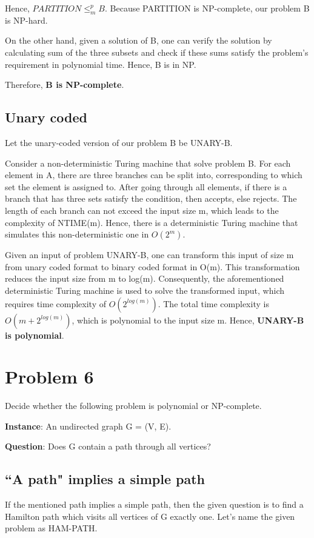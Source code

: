 \documentclass{article}
\begin{document}
Hence, $PARTITION \le_{m}^{p} B$. Because PARTITION is NP-complete, our problem B is NP-hard.

On the other hand, given a solution of B, one can verify the solution by calculating sum of the three subsets and check if these sums satisfy the problem's requirement in polynomial time. Hence, B is in NP.

Therefore,\textbf{ B is NP-complete}.

\subsection{Unary coded}

Let the unary-coded version of our problem B be UNARY-B.

Consider a non-deterministic Turing machine that solve problem B. For each element in A, there are three branches can be split into, corresponding to which set the element is assigned to. After going through all elements, if there is a branch that has three sets satisfy the condition, then accepts, else rejects. The length of each branch can not exceed the input size m, which leads to the complexity of NTIME(m). Hence, there is a deterministic Turing machine that simulates this non-deterministic one in $O(2^m)$.

Given an input of problem UNARY-B, one can transform this input of size m from unary coded format to binary coded format in O(m). This transformation reduces the input size from m to log(m). Consequently, the aforementioned deterministic Turing machine is used to solve the transformed input, which requires time complexity of $O(2^{log(m)})$. The total time complexity is $O(m+2^{log(m)})$, which is polynomial to the input size m. Hence, \textbf{UNARY-B is polynomial}.

\section{Problem 6}
Decide whether the following problem is polynomial or NP-complete.

\textbf{Instance}: An undirected graph G = (V, E).

\textbf{Question}: Does G contain a path through all vertices?

\subsection{``A path" implies a simple path}

If the mentioned path implies a simple path, then the given question is to find a Hamilton path which visits all vertices of G exactly one. Let's name the given problem as HAM-PATH.
\end{document}
